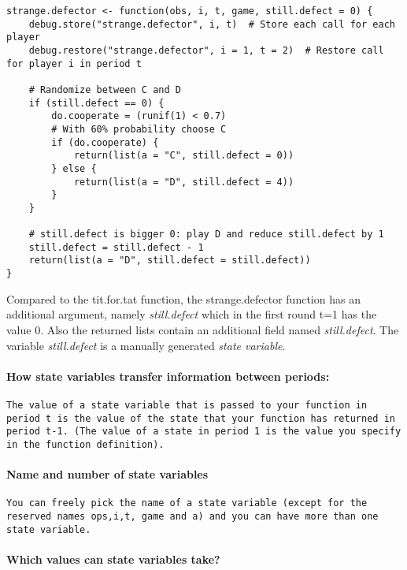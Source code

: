 \documentclass[]{article}
\begin{document}
\begin{verbatim}
strange.defector <- function(obs, i, t, game, still.defect = 0) {
    debug.store("strange.defector", i, t)  # Store each call for each player
    debug.restore("strange.defector", i = 1, t = 2)  # Restore call for player i in period t

    # Randomize between C and D
    if (still.defect == 0) {
        do.cooperate = (runif(1) < 0.7)
        # With 60% probability choose C
        if (do.cooperate) {
            return(list(a = "C", still.defect = 0))
        } else {
            return(list(a = "D", still.defect = 4))
        }
    }

    # still.defect is bigger 0: play D and reduce still.defect by 1
    still.defect = still.defect - 1
    return(list(a = "D", still.defect = still.defect))
}
\end{verbatim}

Compared to the tit.for.tat function, the strange.defector function has
an additional argument, namely \emph{still.defect} which in the first
round t=1 has the value 0. Also the returned lists contain an additional
field named \emph{still.defect}. The variable \emph{still.defect} is a
manually generated \emph{state variable}.

\paragraph{How state variables transfer information between periods:}

\begin{verbatim}
The value of a state variable that is passed to your function in period t is the value of the state that your function has returned in period t-1. (The value of a state in period 1 is the value you specify in the function definition).
\end{verbatim}

\paragraph{Name and number of state variables}

\begin{verbatim}
You can freely pick the name of a state variable (except for the reserved names ops,i,t, game and a) and you can have more than one state variable.
\end{verbatim}

\paragraph{Which values can state variables take?}
\end{document}
